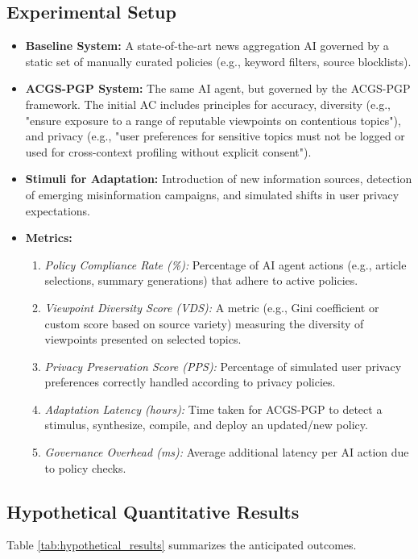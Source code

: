 \documentclass[sigconf,review,screen]{acmart}
\begin{document}
\subsection{Experimental Setup}
\begin{itemize}
    \item \textbf{Baseline System:} A state-of-the-art news aggregation AI governed by a static set of manually curated policies (e.g., keyword filters, source blocklists).
    \item \textbf{ACGS-PGP System:} The same AI agent, but governed by the ACGS-PGP framework. The initial AC includes principles for accuracy, diversity (e.g., "ensure exposure to a range of reputable viewpoints on contentious topics"), and privacy (e.g., "user preferences for sensitive topics must not be logged or used for cross-context profiling without explicit consent").
    \item \textbf{Stimuli for Adaptation:} Introduction of new information sources, detection of emerging misinformation campaigns, and simulated shifts in user privacy expectations.
    \item \textbf{Metrics:}
        \begin{enumerate}
            \item \textit{Policy Compliance Rate (\%):} Percentage of AI agent actions (e.g., article selections, summary generations) that adhere to active policies.
            \item \textit{Viewpoint Diversity Score (VDS):} A metric (e.g., Gini coefficient or custom score based on source variety) measuring the diversity of viewpoints presented on selected topics.
            \item \textit{Privacy Preservation Score (PPS):} Percentage of simulated user privacy preferences correctly handled according to privacy policies.
            \item \textit{Adaptation Latency (hours):} Time taken for ACGS-PGP to detect a stimulus, synthesize, compile, and deploy an updated/new policy.
            \item \textit{Governance Overhead (ms):} Average additional latency per AI action due to policy checks.
        \end{enumerate}
\end{itemize}

\subsection{Hypothetical Quantitative Results}
Table \ref{tab:hypothetical_results} summarizes the anticipated outcomes.
\end{document}

